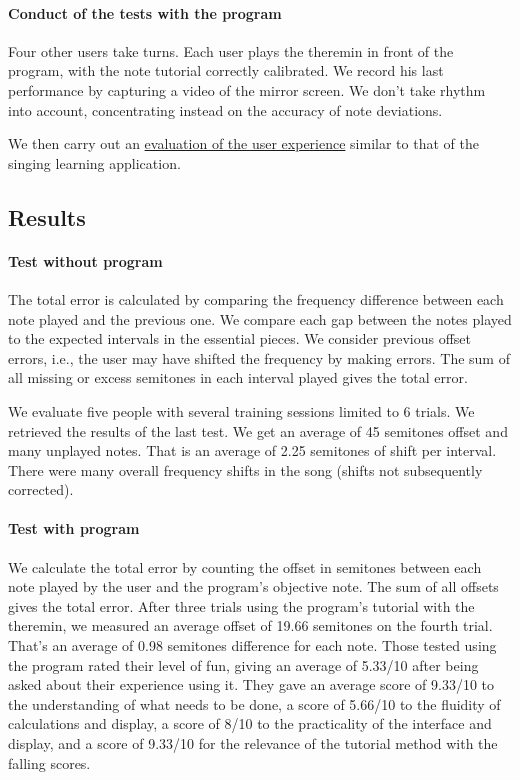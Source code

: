 \paragraph[]{Conduct of the tests with the program}
Four other users take turns. Each user plays the theremin in front of the program, with the note tutorial correctly calibrated. We record his last performance by capturing a video of the mirror screen. We don't take rhythm into account, concentrating instead on the accuracy of note deviations.

We then carry out an \hyperref[sec:eval_user_exp]{evaluation of the user experience} similar to that of the singing learning application.

\subsection{Results}

\paragraph{Test without program}
The total error is calculated by comparing the frequency difference between each note played and the previous one. We compare each gap between the notes played to the expected intervals in the essential pieces. We consider previous offset errors, i.e., the user may have shifted the frequency by making errors. The sum of all missing or excess semitones in each interval played gives the total error.

We evaluate five people with several training sessions limited to 6 trials. We retrieved the results of the last test. We get an average of 45 semitones offset and many unplayed notes. That is an average of 2.25 semitones of shift per interval. There were many overall frequency shifts in the song (shifts not subsequently corrected).

\paragraph{Test with program}
We calculate the total error by counting the offset in semitones between each note played by the user and the program's objective note. The sum of all offsets gives the total error.
After three trials using the program's tutorial with the theremin, we measured an average offset of 19.66 semitones on the fourth trial. That's an average of 0.98 semitones difference for each note.
Those tested using the program rated their level of fun, giving an average of 5.33/10 after being asked about their experience using it. They gave an average score of 9.33/10 to the understanding of what needs to be done, a score of 5.66/10 to the fluidity of calculations and display, a score of 8/10 to the practicality of the interface and display, and a score of 9.33/10 for the relevance of the tutorial method with the falling scores.

